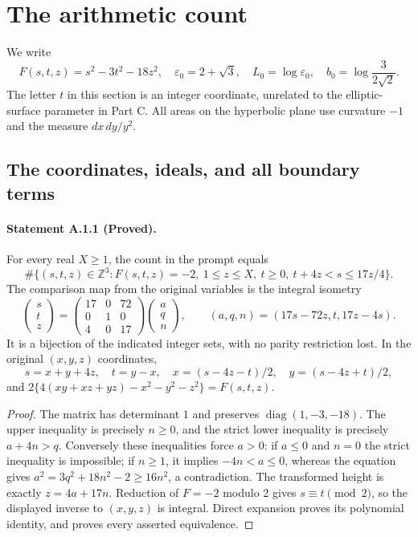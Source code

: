 \section{The arithmetic count}\label{sec:A}
We write
\[
 F(s,t,z)=s^2-3t^2-18z^2,\quad
 \varepsilon_0=2+\sqrt3,\quad L_0=\log\varepsilon_0,
 \quad b_0=\log\frac3{2\sqrt2}.
\]
The letter $t$ in this section is an integer coordinate, unrelated to the
elliptic-surface parameter in Part C. All areas on the hyperbolic plane use
curvature $-1$ and the measure $dx\,dy/y^2$.

\subsection{The coordinates, ideals, and all boundary terms}
\paragraph{Statement A.1.1 (Proved).}
For every real $X\geq1$, the count in the prompt equals
\[
 \#\{(s,t,z)\in\mathbb Z^3:F(s,t,z)=-2,\ 1\leq z\leq X,
 \ t\geq0,\ t+4z<s\leq17z/4\}.
\]
The comparison map from the original variables is the integral isometry
\[
 \begin{pmatrix}s\\t\\z\end{pmatrix}=
 \begin{pmatrix}17&0&72\\0&1&0\\4&0&17\end{pmatrix}
 \begin{pmatrix}a\\q\\n\end{pmatrix},\qquad
 (a,q,n)=(17s-72z,t,17z-4s).
\]
It is a bijection of the indicated integer sets, with no parity restriction
lost. In the original $(x,y,z)$ coordinates,
\[
 s=x+y+4z,\quad t=y-x,\quad
 x=(s-4z-t)/2,\quad y=(s-4z+t)/2,
\]
and $2\{4(xy+xz+yz)-x^2-y^2-z^2\}=F(s,t,z)$.
\begin{proof}
The matrix has determinant $1$ and preserves $\operatorname{diag}(1,-3,-18)$.
The upper inequality is precisely $n\geq0$, and the strict lower inequality
is precisely $a+4n>q$. Conversely these inequalities force $a>0$:
if $a\leq0$ and $n=0$ the strict inequality is impossible; if $n\geq1$, it
implies $-4n<a\leq0$, whereas the equation gives
$a^2=3q^2+18n^2-2\geq16n^2$, a contradiction. The transformed height is
exactly $z=4a+17n$. Reduction of $F=-2$ modulo $2$ gives $s\equiv t\pmod2$,
so the displayed inverse to $(x,y,z)$ is integral. Direct expansion proves
its polynomial identity, and proves every asserted equivalence.
\end{proof}

